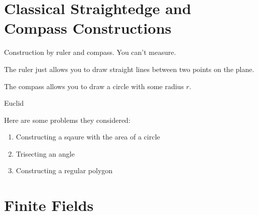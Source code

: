\documentclass{article}
\theoremstyle{definition}
\begin{document}
\newpage

\section{Classical Straightedge and Compass Constructions}


Construction by ruler and compass. You can't measure.

The ruler just allows you to draw straight lines between two points on the plane.

The compass allows you to draw a circle with some radius $r$.

Euclid

Here are some problems they considered:
\begin{enumerate}
    \item Constructing a sqaure with the area of a circle
    \item Trisecting an angle
    \item Constructing a regular polygon
\end{enumerate}

\newpage

\section{Finite Fields}
\end{document}
